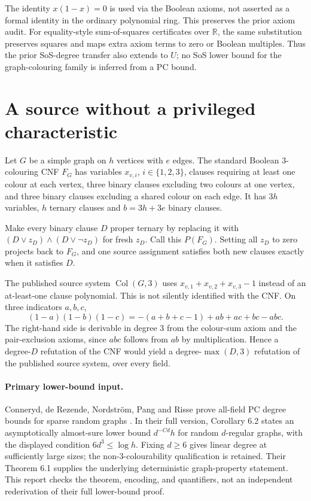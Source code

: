 \documentclass[11pt]{article}
\newcommand{\Col}{\operatorname{Col}}
\begin{document}
The identity $x(1-x)=0$ is used via the Boolean axioms, not asserted as a formal
identity in the ordinary polynomial ring. This preserves the prior axiom audit.
For equality-style sum-of-squares certificates over $\mathbb R$, the same
substitution preserves squares and maps extra axiom terms to zero or Boolean
multiples. Thus the prior SoS-degree transfer also extends to $U$; no SoS
lower bound for the graph-colouring family is inferred from a PC bound.

\section{A source without a privileged characteristic}
Let $G$ be a simple graph on $h$ vertices with $e$ edges. The standard Boolean
3-colouring CNF $F_G$ has variables $x_{v,i}$, $i\in\{1,2,3\}$, clauses requiring
at least one colour at each vertex, three binary clauses excluding two colours
at one vertex, and three binary clauses excluding a shared colour on each edge.
It has $3h$ variables, $h$ ternary clauses and $b=3h+3e$ binary clauses.

Make every binary clause $D$ proper ternary by replacing it with
$(D\lor z_D)\land(D\lor\neg z_D)$ for fresh $z_D$. Call this $P(F_G)$.
Setting all $z_D$ to zero projects back to $F_G$, and one source assignment
satisfies both new clauses exactly when it satisfies $D$.

The published source system $\Col(G,3)$ uses $x_{v,1}+x_{v,2}+x_{v,3}-1$
instead of an at-least-one clause polynomial. This is not silently identified
with the CNF. On three indicators $a,b,c$,
\[
(1-a)(1-b)(1-c)=-(a+b+c-1)+ab+ac+bc-abc.
\]
The right-hand side is derivable in degree 3 from the colour-sum axiom and
the pair-exclusion axioms, since $abc$ follows from $ab$ by multiplication.
Hence a degree-$D$ refutation of the CNF would yield a degree-$\max(D,3)$
refutation of the published source system, over every field.

\paragraph{Primary lower-bound input.}
Conneryd, de Rezende, Nordstr\"om, Pang and Risse prove all-field PC degree
bounds for sparse random graphs \cite{Coloring}. In their full version,
Corollary 6.2 states an asymptotically almost-sure lower bound
$d^{-Cd}h$ for random $d$-regular graphs, with the displayed condition
$6d^3\le\log h$. Fixing $d\ge6$ gives linear degree at sufficiently large
sizes; the non-3-colourability qualification is retained. Their
Theorem 6.1 supplies the underlying deterministic graph-property statement.
This report checks the theorem, encoding, and quantifiers, not an independent
rederivation of their full lower-bound proof.
\end{document}
